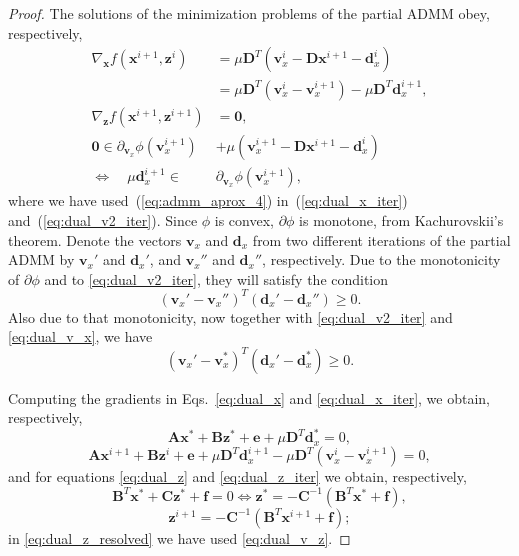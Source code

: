 \documentclass[10pt,twocolumn,twoside]{IEEEtran}
\newcommand{\x}{\mathbf{x}} %
\newcommand{\z}{\mathbf{z}} %
\newcommand{\vs}{\mathbf{v}} %
\newcommand{\dv}{\mathbf{d}} %
\newcommand{\D}{\mathbf{D}} %
\newcommand{\A}{\mathbf{A}} %
\newcommand{\B}{\mathbf{B}} %
\newcommand{\C}{\mathbf{C}} %
\newcommand{\e}{\mathbf{e}} %
\newcommand{\f}{\mathbf{f}} %
\begin{document}
\begin{proof}
	The solutions of the minimization problems of the partial ADMM obey, respectively,
	\begin{align}
	\nabla_{\x} f(\x^{i+1}, \z^i) &= \mu \D^T (\vs_x^i - \D \x^{i+1} - \dv_x^i) \nonumber \\
	&= \mu \D^T (\vs_x^i - \vs_x^{i+1}) - \mu \D^{T} \dv_x^{i+1}, \label{eq:dual_x_iter} \\
	\nabla_\z f(\x^{i+1}, \z^{i+1}) &= \mathbf 0,  \label{eq:dual_z_iter} \\
	\mathbf 0 \in \partial_{\vs_x} \phi(\vs_x^{i+1}) &+ \mu (\vs_x^{i+1} - \D \x^{i+1} - \dv_x^i) \nonumber \\
	\Leftrightarrow \quad \mu \dv_x^{i+1} \in \; &\partial_{\vs_x} \phi(\vs_x^{i+1}),  \label{eq:dual_v2_iter}
	\end{align}
	where we have used~(\ref{eq:admm_aprox_4}) in~(\ref{eq:dual_x_iter}) and~(\ref{eq:dual_v2_iter}). Since $\phi$ is convex, $\partial \phi$ is monotone, from Kachurovskii's theorem. Denote the vectors $\vs_x$ and $\dv_x$ from two different iterations of the partial ADMM by $\vs_x'$ and $\dv_x'$, and $\vs_x''$ and $\dv_x''$, respectively. Due to the monotonicity of $\partial \phi$ and to \eqref{eq:dual_v2_iter}, they will satisfy the condition
	\begin{equation} \label{eq:monotone1}
	(\vs_x' - \vs_x'')^T (\dv_x' - \dv_x'') \geq 0.
	\end{equation}
	Also due to that monotonicity, now together with \eqref{eq:dual_v2_iter} and \eqref{eq:dual_v_x}, we have
	\begin{equation} \label{eq:monotone2}
	(\vs_x' - \vs_x^*)^T (\dv_x' - \dv_x^*) \geq 0.
	\end{equation}

	Computing the gradients in Eqs.~\eqref{eq:dual_x} and \eqref{eq:dual_x_iter}, we obtain, respectively,
	\begin{equation} \label{eq:dual_x_resolved}
	\A \x^* + \B \z^* + \e + \mu \D^T \dv_x^* = 0,
	\end{equation}
	\begin{equation} \label{eq:dual_x_iter_resolved}
	\A \x^{i+1} + \B \z^i + \e + \mu \D^T \dv_x^{i+1} - \mu \D^T (\vs_x^i - \vs_x^{i+1}) = 0,
	\end{equation}
	and for equations \eqref{eq:dual_z} and \eqref{eq:dual_z_iter} we obtain, respectively,
	\begin{equation} \label{eq:dual_z_resolved}
	\B^T \x^* + \C \z^* + \f = 0 \Leftrightarrow \z^* = - \C^{-1} (\B^T \x^* + \f),
	\end{equation}
	\begin{equation} \label{eq:dual_z_iter_resolved}
	\z^{i+1} = - \C^{-1} (\B^T \x^{i+1} + \f);
	\end{equation}
	in \eqref{eq:dual_z_resolved} we have used \eqref{eq:dual_v_z}.


\end{proof}
\end{document}
